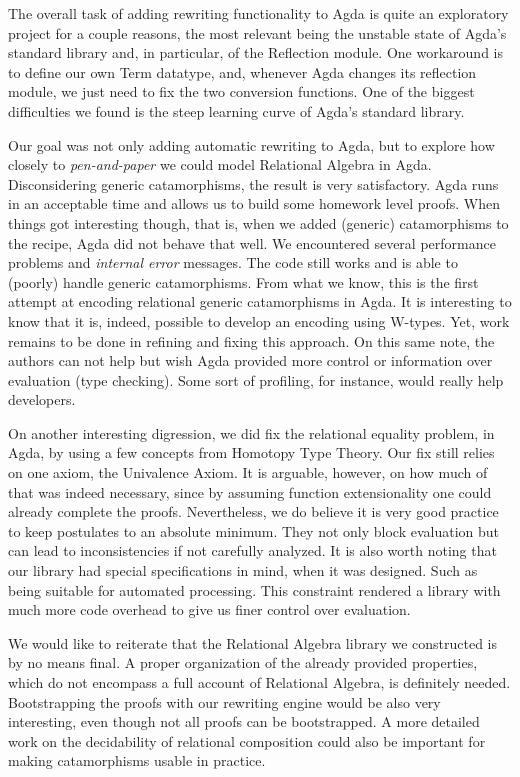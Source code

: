 The overall task of adding rewriting functionality to Agda is quite an exploratory 
project for a couple reasons, the most relevant being the unstable state of Agda's
standard library and, in particular, of the Reflection module. One workaround
is to define our own Term datatype, and, whenever Agda changes its reflection module,
we just need to fix the two conversion functions. One of the biggest difficulties
we found is the steep learning curve of Agda's standard library.

Our goal was not only adding automatic rewriting to Agda, but to explore how closely
to \emph{pen-and-paper} we could model Relational Algebra in Agda. Disconsidering generic catamorphisms,
the result is very satisfactory. Agda runs in an acceptable time and allows us to build
some homework level proofs. When things got interesting though, that is, when we added (generic) catamorphisms to
the recipe, Agda did not behave that well. We encountered several performance problems
and \emph{internal error} messages. The code still works and is able to (poorly) handle
generic catamorphisms. From what we know, this is the first attempt at encoding relational generic catamorphisms
in Agda. It is interesting to know that it is, indeed, possible to develop an encoding using W-types. Yet,
work remains to be done in refining and fixing this approach. On this same note, the authors
can not help but wish Agda provided more control or information over evaluation (type checking).
Some sort of profiling, for instance, would really help developers.

On another interesting digression, we did fix the relational equality problem, in Agda,
by using a few concepts from Homotopy Type Theory. Our fix still relies on one axiom, the Univalence Axiom.
It is arguable, however, on how much of that was indeed necessary, since by assuming
function extensionality one could already complete the proofs.
Nevertheless, we do believe it is very good practice to keep postulates to an absolute minimum. 
They not only block evaluation but can lead to inconsistencies if not carefully analyzed. 
It is also worth noting that our library had special specifications in mind, when it was designed.
Such as being suitable for automated processing. This constraint rendered a library
with much more code overhead to give us finer control over evaluation.

We would like to reiterate that the Relational Algebra library we constructed is by no means final.
A proper organization of the already provided properties, which do not encompass a full account
of Relational Algebra, is definitely needed. Bootstrapping the proofs with our rewriting engine
would be also very interesting, even though not all proofs can be bootstrapped. A more
detailed work on the decidability of relational composition could also be important for
making catamorphisms usable in practice.

